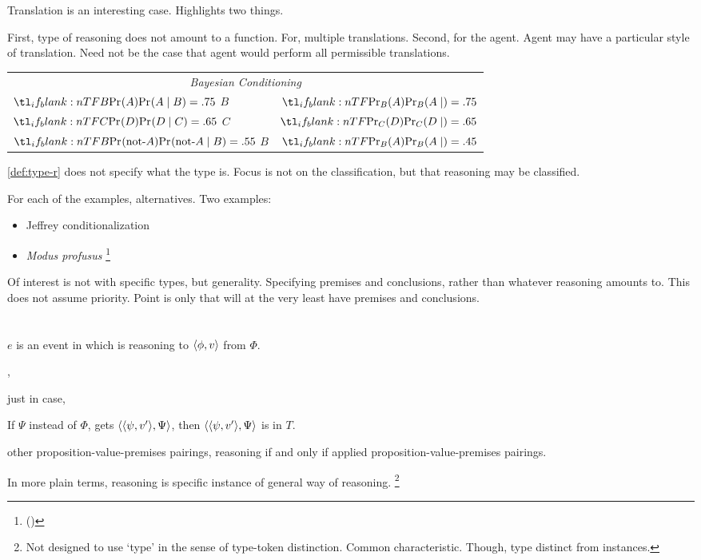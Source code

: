 \begin{note}
  Translation is an interesting case.
  Highlights two things.

  First, type of reasoning does not amount to a function.
  For, multiple translations.
  Second, for the agent.
  Agent may have a particular style of translation.
  Need not be the case that agent would perform all permissible translations.

  \begin{tabular}[h]{l|r}
    \multicolumn{2}{c}{\emph{Bayesian Conditioning}} \\
    \(\pr[B]{A} = .75\) \(B\)  & \(\pr[][B]{A} = .75\) \\
    \(\pr[C]{D} = .65\) \(C\) & \(\pr[][C]{D} = .65\) \\
    \(\pr[B]{\text{not-}A} = .55\) \(B\) & \(\pr[][B]{A} = .45\)
  \end{tabular}
\end{note}

\begin{note}
  \autoref{def:type-r} does not specify what the type is.
  Focus is not on the classification, but that reasoning may be classified.

  For each of the examples, alternatives.
  Two examples:
  \begin{itemize}
  \item
    Jeffrey conditionalization
  \item
    \emph{Modus profusus}%
    \footnote{
       (\cite[317]{Turri:2010aa})
    }
  \end{itemize}

  Of interest is not with specific types, but generality.
  Specifying premises and conclusions, rather than whatever reasoning amounts to.
  This does not assume priority.
  Point is only that will at the very least have premises and conclusions.
\end{note}


\section{}
\label{sec:sr2-1}

\begin{note}
  \begin{definition}[\sR{2}]
    \label{def:cmptnc}
    \(e\) is an event in which \vAgent{} is reasoning to \(\langle \phi, v \rangle\) from \(\Phi\).

    \emph{},

    just in case,

    If \(\Psi\) instead of \(\Phi\), gets \(\langle \langle \psi, v' \rangle, \Psi \rangle\), then \(\langle \langle \psi, v' \rangle, \Psi \rangle\) is in \(T\).


    other proposition-value-premises pairings, reasoning if and only if applied proposition-value-premises pairings.
  \end{definition}

  In more plain terms, reasoning is specific instance of general way of reasoning.%
  \footnote{
    Not designed to use `type' in the sense of type-token distinction.
    Common characteristic.
    Though, type distinct from instances.
  }
\end{note}


